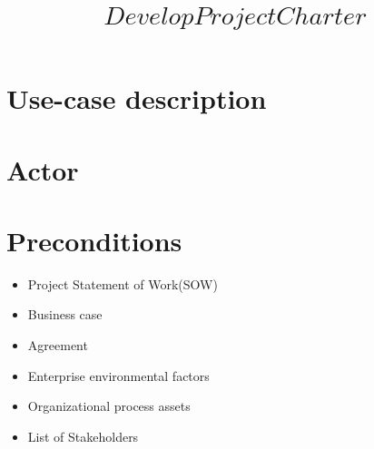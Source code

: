 \documentclass[notitlepage]{article}
\date{}
\author{}
\title{#1}
\newcommand{\name}[1]{%
   \title{#1}
   \maketitle
}
\begin{document}
   \name{$$Develop Project Charter$$}

\vspace{-2cm}%

\section{Use-case description}

\begin{comment}
	{\noindent Development of project charter is the ability to let the user create a project charter.}
\end{comment}


\section{Actor}

\begin{comment}
	{Project Manager/User}
\end{comment}
\section{Preconditions}

\begin{comment}
	{The following preconditions have to be present:}
\end{comment}

\begin{itemize}
  \item Project Statement of Work(SOW)
  \item Business case
  \item Agreement
  \item Enterprise environmental factors
  \item Organizational process assets 
  \item List of Stakeholders
\end{itemize}
\end{document}
